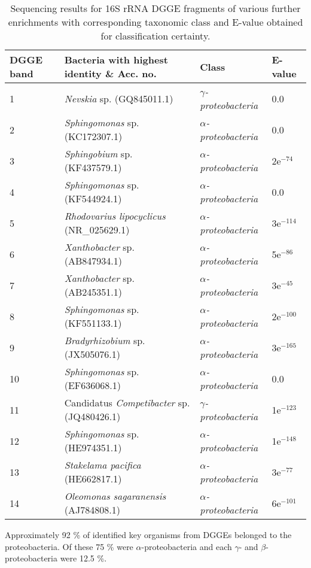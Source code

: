 \documentclass[twoside]{article}
\begin{document}
\begin{table}
\caption{Sequencing results for 16S rRNA DGGE fragments of various further enrichments with corresponding taxonomic class and E-value obtained for classification certainty.}
\begin{tabular}{ | l | p{7.8cm} | p{3cm} | l | }
\hline
DGGE band & Bacteria with highest identity \& Acc. no. & Class & E-value \\
\hline
1 & \emph{Nevskia} sp. (GQ845011.1) & \emph{$\gamma$-proteobacteria} & 0.0  \\
\hline
2 & \emph{Sphingomonas} sp. (KC172307.1) & \emph{$\alpha$-proteobacteria} & 0.0 \\
\hline
3 & \emph{Sphingobium} sp. (KF437579.1) & \emph{$\alpha$-proteobacteria} & 2e$^{-74}$ \\
\hline
4 & \emph{Sphingomonas} sp. (KF544924.1) & \emph{$\alpha$-proteobacteria} & 0.0  \\
\hline
5 & \emph{Rhodovarius lipocyclicus} (NR\_025629.1) & \emph{$\alpha$-proteobacteria} & 3e$^{-114}$ \\
\hline
6 & \emph{Xanthobacter} sp. (AB847934.1) & \emph{$\alpha$-proteobacteria} & 5e$^{-86}$  \\
\hline
7 & \emph{Xanthobacter} sp. (AB245351.1) & \emph{$\alpha$-proteobacteria} & 3e$^{-45}$  \\
\hline
8 & \emph{Sphingomonas} sp.(KF551133.1) & \emph{$\alpha$-proteobacteria} & 2e$^{-100}$  \\
\hline
9 & \emph{Bradyrhizobium} sp. (JX505076.1) & \emph{$\alpha$-proteobacteria} & 3e$^{-165}$  \\
\hline
10 & \emph{Sphingomonas} sp. (EF636068.1) & \emph{$\alpha$-proteobacteria} & 0.0  \\
\hline
11 & Candidatus \emph{Competibacter} sp. (JQ480426.1) & \emph{$\gamma$-proteobacteria} & 1e$^{-123}$  \\
\hline
12 & \emph{Sphingomonas} sp. (HE974351.1) & \emph{$\alpha$-proteobacteria} &  1e$^{-148}$ \\
\hline
13 & \emph{Stakelama pacifica} (HE662817.1) & \emph{$\alpha$-proteobacteria} & 3e$^{-77}$  \\
\hline
14 & \emph{Oleomonas sagaranensis} (AJ784808.1) & \emph{$\alpha$-proteobacteria} & 6e$^{-101}$  \\
\hline
\end{tabular}

\end{table}
\FloatBarrier
Approximately 92 \% of identified key organisms from DGGEs belonged to the proteobacteria. Of these 75 \% were \emph{$\alpha$}-proteobacteria  and each \emph{$\gamma$}- and \emph{$\beta$}- proteobacteria were 12.5 \%.
\end{document}
